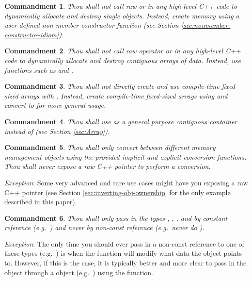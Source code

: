 \documentclass[pdf,ps2pdf,11pt]{SANDreport}
\newtheorem{commandment}{Commandment}
\begin{document}
\begin{commandment}
Thou shall not call raw {} or {} in any
high-level C++ code to dynamically allocate and destroy single
objects.  Instead, create memory using a user-defined non-member
constructor function (see Section
{}\ref{sec:nonmember-constructor-idiom}).
\end{commandment}

\begin{commandment}
Thou shall not call raw operator {} or {} in any high-level C++ code to dynamically allocate and destroy
contiguous arrays of data.  Instead, use functions such as
{} and {}.
\end{commandment}

\begin{commandment}
Thou shall not directly create and use compile-time fixed sized arrays
with {}.  Instead, create compile-time fixed-sized arrays
using {} and convert to
{} for more general usage.
\end{commandment}

\begin{commandment}
Thou shall use {} as a general purpose
contiguous container instead of {} (see Section
{}\ref{sec:Array}).
\end{commandment}

\begin{commandment}
Thou shall only convert between different memory management objects
using the provided implicit and explicit conversion functions.  Thou
shall never expose a raw C++ pointer to perform a conversion.
\end{commandment}
{}\textit{Exception}: Some very advanced and rare use cases might have
you exposing a raw C++ pointer (see Section
{}\ref{sec:inverting-obj-ownership} for the only example described in
this paper).

\begin{commandment}
Thou shall only pass in the types {},
{}, {}, and
{} by constant reference (e.g.\
{}) and never by non-const reference (e.g.\
never do {}).
\end{commandment}
{}\textit{Exception}: The only time you should ever pass in a
non-const reference to one of these types (e.g.\ {}\ttt{RCP<T>
\&a}) is when the function will modify what data the object points to.
However, if this is the case, it is typically better and more clear to
pass in the object through a {}\ttt{Teuchos::Ptr} object (e.g.\
{}) using the {} 
function.
\end{document}
